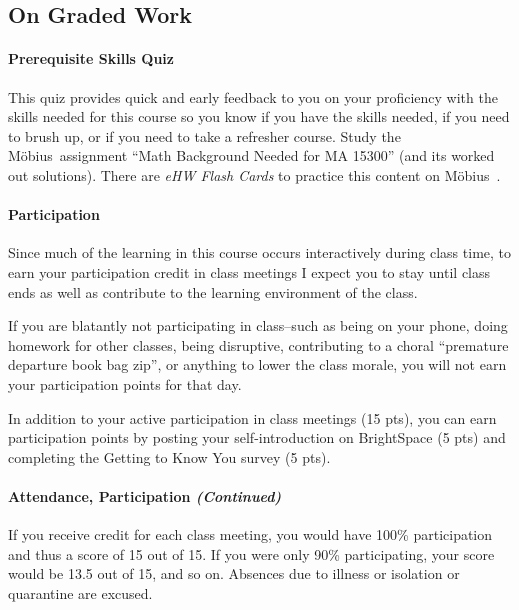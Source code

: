 \documentclass[letterpaper,twoside]{article}
\def\Mobius{M\"obius\ }
\begin{document}
\begin{multicols*}{2}
\begin{center}
        \normalsize
    \end{center}
    \subsection*{On Graded Work}
    \paragraph{Prerequisite Skills Quiz}
    This quiz provides quick and early feedback to you on your proficiency with the skills needed for this course so you know if you have the skills needed, if you need to brush up, or if you need to take a refresher course.
    Study the \Mobius assignment ``Math Background Needed for MA 15300'' (and its worked out solutions).
    There are \textit{eHW Flash Cards} to practice this content on \Mobius.

    \paragraph{Participation}
    Since much of the learning in this course occurs interactively during class time, to earn your participation credit in class meetings I expect you to stay until class ends as well as contribute to the learning environment of the class.

    If you are blatantly not participating in class--such as being on your phone, doing homework for other classes, being disruptive, contributing to a choral ``premature departure book bag zip'', or anything to lower the class morale, you will not earn your participation points for that day.

    In addition to your active participation in class meetings (15 pts), you can earn participation points by posting your self-introduction on BrightSpace (5 pts) and completing the Getting to Know You survey (5 pts).

    \paragraph*{Attendance, Participation \textit{(Continued)}}
    If you receive credit for each class meeting, you would have 100\% participation and thus a score of 15 out of 15.
    If you were only 90\% participating, your score would be 13.5 out of 15, and so on.
    Absences due to illness or isolation or quarantine are excused.


\end{multicols*}
\end{document}

